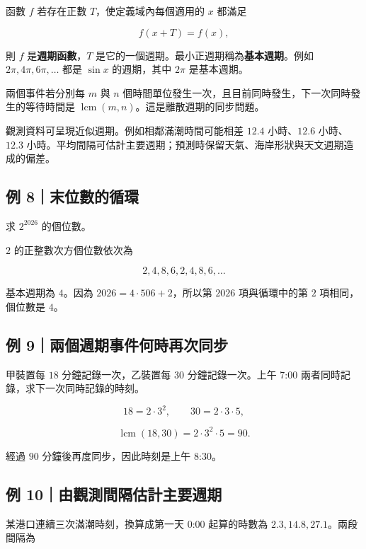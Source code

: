 \documentclass[11pt,a4paper]{article}
\begin{document}
函數 \(f\) 若存在正數 \(T\)，使定義域內每個適用的 \(x\) 都滿足

\[
f(x+T)=f(x),
\]

則 \(f\) 是\textbf{週期函數}，\(T\) 是它的一個週期。最小正週期稱為\textbf{基本週期}。例如 \(2\pi,4\pi,6\pi,\ldots\) 都是 \(\sin x\) 的週期，其中 \(2\pi\) 是基本週期。

兩個事件若分別每 \(m\) 與 \(n\) 個時間單位發生一次，且目前同時發生，下一次同時發生的等待時間是 \(\operatorname{lcm}(m,n)\)。這是離散週期的同步問題。

觀測資料可呈現近似週期。例如相鄰滿潮時間可能相差 \(12.4\) 小時、\(12.6\) 小時、\(12.3\) 小時。平均間隔可估計主要週期；預測時保留天氣、海岸形狀與天文週期造成的偏差。

\subsection{例 8｜末位數的循環}\label{ux4f8b-8ux672bux4f4dux6578ux7684ux5faaux74b0}

求 \(2^{2026}\) 的個位數。

\(2\) 的正整數次方個位數依次為

\[
2,4,8,6,2,4,8,6,\ldots
\]

基本週期為 \(4\)。因為 \(2026=4\cdot506+2\)，所以第 \(2026\) 項與循環中的第 \(2\) 項相同，個位數是 \(4\)。

\subsection{例 9｜兩個週期事件何時再次同步}\label{ux4f8b-9ux5169ux500bux9031ux671fux4e8bux4ef6ux4f55ux6642ux518dux6b21ux540cux6b65}

甲裝置每 \(18\) 分鐘記錄一次，乙裝置每 \(30\) 分鐘記錄一次。上午 7:00 兩者同時記錄，求下一次同時記錄的時刻。

\[
18=2\cdot3^2,\qquad30=2\cdot3\cdot5,
\]

\[
\operatorname{lcm}(18,30)=2\cdot3^2\cdot5=90.
\]

經過 \(90\) 分鐘後再度同步，因此時刻是上午 8:30。

\subsection{例 10｜由觀測間隔估計主要週期}\label{ux4f8b-10ux7531ux89c0ux6e2cux9593ux9694ux4f30ux8a08ux4e3bux8981ux9031ux671f}

某港口連續三次滿潮時刻，換算成第一天 0:00 起算的時數為 \(2.3,14.8,27.1\)。兩段間隔為
\end{document}
